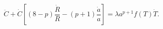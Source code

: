 \begin{equation}\label{RR_ansatz}
{\ddot{C}}+ {\dot{C}}\left[(8-p){\frac{{\dot{R}}}{R}}
-(p+1){\frac{{\dot{a}}}{a}}\right] = \lambda a^{p+1}f(T)
{\dot{T}}.
\end{equation}

